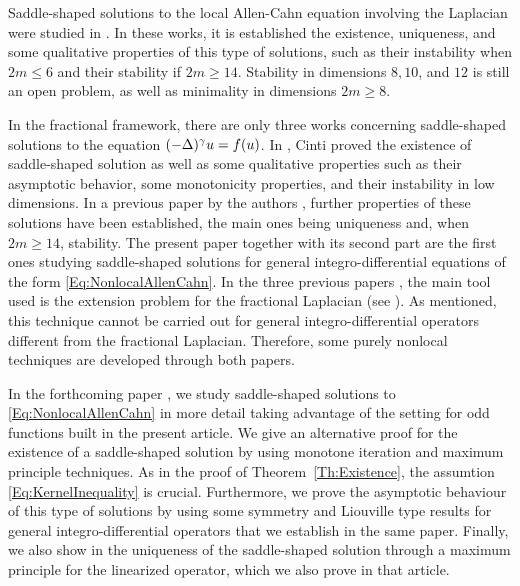 Saddle-shaped solutions to the local Allen-Cahn equation involving the Laplacian were studied in \cite{DangFifePeletier, Schatzman, CabreTerraI,CabreTerraII, Cabre-Saddle}. In these works, it is established the existence, uniqueness, and some qualitative properties of this type of solutions, such as their instability when $2m\leq 6$ and their stability if $2m\geq 14$. Stability in dimensions $8, 10$, and $12$ is still an open problem, as well as minimality in dimensions $2m\geq 8$.

In the fractional framework, there are only three works concerning saddle-shaped solutions to the equation $(-\Delta)^\gamma u = f(u)$. In \cite{Cinti-Saddle,Cinti-Saddle2}, Cinti proved the existence of saddle-shaped solution as well as some qualitative properties such as their asymptotic behavior, some monotonicity properties, and their instability in low dimensions. In a previous paper by the authors \cite{Felipe-Sanz-Perela:SaddleFractional}, further properties of these solutions have been established, the main ones being uniqueness and, when $2m\geq 14$, stability. The present paper together with its second part \cite{FelipeSanz-Perela:IntegroDifferentialII} are the first ones studying saddle-shaped solutions for general integro-differential equations of the form \eqref{Eq:NonlocalAllenCahn}. In the three previous papers \cite{Cinti-Saddle, Cinti-Saddle2, Felipe-Sanz-Perela:SaddleFractional}, the main tool used is the extension problem for the fractional Laplacian (see \cite{CaffarelliSilvestre}). As mentioned, this technique cannot be carried out for general integro-differential operators different from the fractional Laplacian. Therefore, some purely nonlocal techniques are developed through both papers.

In the forthcoming paper \cite{FelipeSanz-Perela:IntegroDifferentialII}, we study saddle-shaped solutions to \eqref{Eq:NonlocalAllenCahn} in more detail taking advantage of the setting for odd functions built in the present article. We give an alternative proof for the existence of a saddle-shaped solution by using monotone iteration and maximum principle techniques. As in the proof of Theorem~\ref{Th:Existence}, the assumtion \eqref{Eq:KernelInequality} is crucial. Furthermore, we prove the asymptotic behaviour of this type of solutions by using some symmetry and Liouville type results for general integro-differential operators that we establish in the same paper. Finally, we also show in \cite{FelipeSanz-Perela:IntegroDifferentialII} the uniqueness of the saddle-shaped solution through a maximum principle for the linearized operator, which we also prove in that article.

